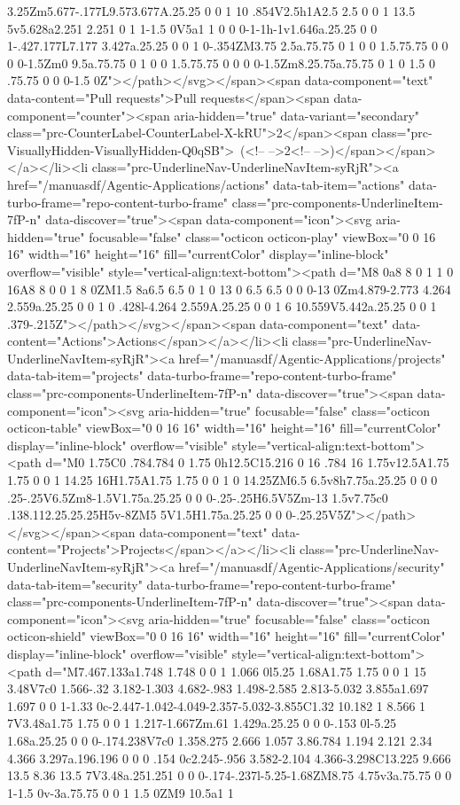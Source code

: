 {{3.25Zm5.677-.177L9.573.677A.25.25 0 0 1 10 .854V2.5h1A2.5 2.5 0 0 1 13.5 5v5.628a2.251 2.251 0 1 1-1.5 0V5a1 1 0 0 0-1-1h-1v1.646a.25.25 0 0 1-.427.177L7.177 3.427a.25.25 0 0 1 0-.354ZM3.75 2.5a.75.75 0 1 0 0 1.5.75.75 0 0 0 0-1.5Zm0 9.5a.75.75 0 1 0 0 1.5.75.75 0 0 0 0-1.5Zm8.25.75a.75.75 0 1 0 1.5 0 .75.75 0 0 0-1.5 0Z"></path></svg></span><span data-component="text" data-content="Pull requests">Pull requests</span><span data-component="counter"><span aria-hidden="true" data-variant="secondary" class="prc-CounterLabel-CounterLabel-X-kRU">2</span><span class="prc-VisuallyHidden-VisuallyHidden-Q0qSB"> (<!-- -->2<!-- -->)</span></span></a></li><li class="prc-UnderlineNav-UnderlineNavItem-syRjR"><a href="/manuasdf/Agentic-Applications/actions" data-tab-item="actions" data-turbo-frame="repo-content-turbo-frame" class="prc-components-UnderlineItem-7fP-n" data-discover="true"><span data-component="icon"><svg aria-hidden="true" focusable="false" class="octicon octicon-play" viewBox="0 0 16 16" width="16" height="16" fill="currentColor" display="inline-block" overflow="visible" style="vertical-align:text-bottom"><path d="M8 0a8 8 0 1 1 0 16A8 8 0 0 1 8 0ZM1.5 8a6.5 6.5 0 1 0 13 0 6.5 6.5 0 0 0-13 0Zm4.879-2.773 4.264 2.559a.25.25 0 0 1 0 .428l-4.264 2.559A.25.25 0 0 1 6 10.559V5.442a.25.25 0 0 1 .379-.215Z"></path></svg></span><span data-component="text" data-content="Actions">Actions</span></a></li><li class="prc-UnderlineNav-UnderlineNavItem-syRjR"><a href="/manuasdf/Agentic-Applications/projects" data-tab-item="projects" data-turbo-frame="repo-content-turbo-frame" class="prc-components-UnderlineItem-7fP-n" data-discover="true"><span data-component="icon"><svg aria-hidden="true" focusable="false" class="octicon octicon-table" viewBox="0 0 16 16" width="16" height="16" fill="currentColor" display="inline-block" overflow="visible" style="vertical-align:text-bottom"><path d="M0 1.75C0 .784.784 0 1.75 0h12.5C15.216 0 16 .784 16 1.75v12.5A1.75 1.75 0 0 1 14.25 16H1.75A1.75 1.75 0 0 1 0 14.25ZM6.5 6.5v8h7.75a.25.25 0 0 0 .25-.25V6.5Zm8-1.5V1.75a.25.25 0 0 0-.25-.25H6.5V5Zm-13 1.5v7.75c0 .138.112.25.25.25H5v-8ZM5 5V1.5H1.75a.25.25 0 0 0-.25.25V5Z"></path></svg></span><span data-component="text" data-content="Projects">Projects</span></a></li><li class="prc-UnderlineNav-UnderlineNavItem-syRjR"><a href="/manuasdf/Agentic-Applications/security" data-tab-item="security" data-turbo-frame="repo-content-turbo-frame" class="prc-components-UnderlineItem-7fP-n" data-discover="true"><span data-component="icon"><svg aria-hidden="true" focusable="false" class="octicon octicon-shield" viewBox="0 0 16 16" width="16" height="16" fill="currentColor" display="inline-block" overflow="visible" style="vertical-align:text-bottom"><path d="M7.467.133a1.748 1.748 0 0 1 1.066 0l5.25 1.68A1.75 1.75 0 0 1 15 3.48V7c0 1.566-.32 3.182-1.303 4.682-.983 1.498-2.585 2.813-5.032 3.855a1.697 1.697 0 0 1-1.33 0c-2.447-1.042-4.049-2.357-5.032-3.855C1.32 10.182 1 8.566 1 7V3.48a1.75 1.75 0 0 1 1.217-1.667Zm.61 1.429a.25.25 0 0 0-.153 0l-5.25 1.68a.25.25 0 0 0-.174.238V7c0 1.358.275 2.666 1.057 3.86.784 1.194 2.121 2.34 4.366 3.297a.196.196 0 0 0 .154 0c2.245-.956 3.582-2.104 4.366-3.298C13.225 9.666 13.5 8.36 13.5 7V3.48a.251.251 0 0 0-.174-.237l-5.25-1.68ZM8.75 4.75v3a.75.75 0 0 1-1.5 0v-3a.75.75 0 0 1 1.5 0ZM9 10.5a1 1 }}
